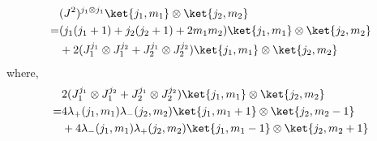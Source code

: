 \begin{itemize}
	\begin{tcolorbox}[title=when $(J^2)^{j_1 \otimes j_1}$ acts on $\ket{j_1, m_1} \otimes \ket{j_2, m_2}$:]
		\begin{align}
			& (J^2)^{j_1 \otimes j_1} \ket{j_1, m_1} \otimes \ket{j_2, m_2} \notag \\
			=& (j_1 (j_1 + 1) + j_2 (j_2 + 1) + 2 m_1 m_2) \ket{j_1, m_1} \otimes \ket{j_2, m_2} \notag \\
			& + 2 (J^{j_1}_1 \otimes J^{j_2}_1 + J^{j_1}_2 \otimes J^{j_2}_2) \ket{j_1, m_1} \otimes \ket{j_2, m_2}
		\end{align}
		where,
		\begin{align}
			& 2 (J^{j_1}_1 \otimes J^{j_2}_1 + J^{j_1}_2 \otimes J^{j_2}_2) \ket{j_1, m_1} \otimes \ket{j_2, m_2} \notag \\
			=& 4 \lambda_+(j_1, m_1) \lambda_-(j_2, m_2) \ket{j_1, m_1 + 1} \otimes \ket{j_2, m_2 - 1} \notag \\
			& + 4 \lambda_-(j_1, m_1) \lambda_+(j_2, m_2) \ket{j_1, m_1 - 1} \otimes \ket{j_2, m_2 + 1}
		\end{align}
	\end{tcolorbox}
\end{itemize}

